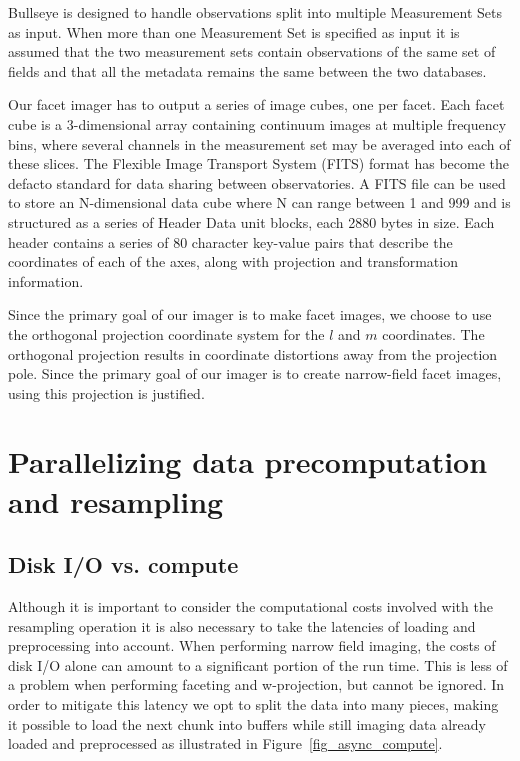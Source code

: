 Bullseye is designed to handle observations split into multiple Measurement Sets as input. When more than one Measurement Set is specified as input it is assumed that
the two measurement sets contain observations of the same set of fields and that all the metadata remains the same between the two databases.

Our facet imager has to output a series of image cubes, one per facet. Each facet cube is a 3-dimensional array containing continuum images at multiple 
frequency bins, where several channels in the measurement set may be averaged into each of these slices. The Flexible Image Transport System (FITS) \cite{pence2010definition} 
format has become the defacto standard for data sharing between observatories. A FITS file can be used to store an N-dimensional data cube where N can range between 1 and 999 and is
structured as a series of Header Data unit blocks, each 2880 bytes in size. Each header contains a series of 80 character key-value pairs that 
describe the coordinates of each of the axes, along with projection and transformation information.

Since the primary goal of our imager is to make facet images, we choose to use the orthogonal projection coordinate system for the $l$ and $m$ coordinates. The orthogonal
projection results in coordinate distortions away from the projection pole. Since the primary goal of our imager is to create narrow-field facet images, using this projection is
justified.

\section{Parallelizing data precomputation and resampling}
\subsection{Disk I/O vs. compute}
Although it is important to consider the computational costs involved with the resampling operation it is also necessary to take the latencies of loading
and preprocessing into account. When performing narrow field imaging, the costs of disk I/O alone can amount to a significant portion of the run time.
This is less of a problem when performing faceting and w-projection, but cannot be ignored. In order to mitigate this latency we opt to split the data into many pieces, making it possible
to load the next chunk into buffers while still imaging data already loaded and preprocessed as illustrated in Figure~\ref{fig_async_compute}.

